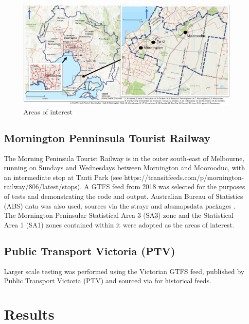 \documentclass[preprint, 3p,
authoryear]{elsarticle} %
\begin{document}
\begin{figure}
\includegraphics[width=1\linewidth]{graphics/all_maps} \caption{Areas of interest}\label{fig:Melbourne_map}
\end{figure}

\hypertarget{mornington-penninsula-tourist-railway}{%
\subsection{Mornington Penninsula Tourist
Railway}\label{mornington-penninsula-tourist-railway}}

The Morning Peninsula Tourist Railway is in the outer south-east of
Melbourne, running on Sundays and Wednesdays between Mornington and
Moorooduc, with an intermediate stop at Tanti Park (see
https://transitfeeds.com/p/mornington-railway/806/latest/stops). A GTFS
feed from 2018 was selected for the purposes of tests and demonstrating
the code and output. Australian Bureau of Statistics (ABS) data was also
used, sources via the strayr and absmapsdata packages \citep{r-strayr}.
The Mornington Peninsular Statistical Area 3 (SA3) zone and the
Statistical Area 1 (SA1) zones contained within it were adopted as the
areas of interest.

\hypertarget{public-transport-victoria-ptv}{%
\subsection{Public Transport Victoria
(PTV)}\label{public-transport-victoria-ptv}}

Larger scale testing was performed using the Victorian GTFS feed,
published by Public Transport Victoria (PTV) and sourced via
\citet{transitfeeds_victoria:2023aa} for historical feeds.

\hypertarget{results}{%
\section{Results}\label{results}}
\end{document}
